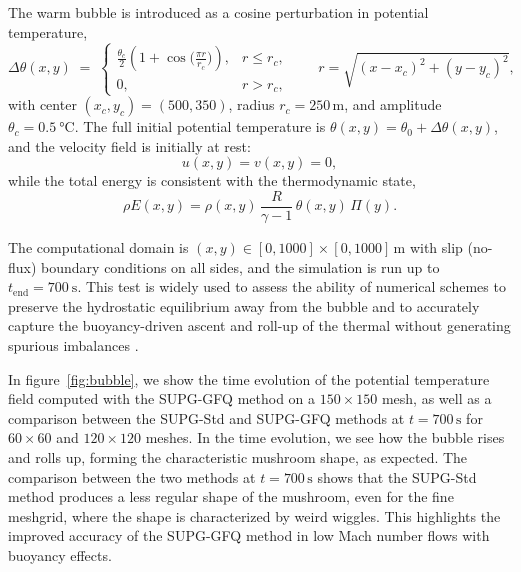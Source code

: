 \documentclass[a4paper,10pt]{article}
\begin{document}
		The warm bubble is introduced as a cosine perturbation in potential temperature,
		\begin{equation}
			\Delta\theta(x,y) \;=\;
			\begin{cases}
				\displaystyle \frac{\theta_c}{2}\left(1+\cos\!\Big(\frac{\pi r}{r_c}\Big)\right), & r \le r_c,\\[0.7em]
				0, & r>r_c,
			\end{cases}
			\qquad 
			r=\sqrt{(x-x_c)^2+(y-y_c)^2},
		\end{equation}
		with center $(x_c,y_c)=(500,350)$, radius $r_c=250\,\mathrm{m}$, and amplitude $\theta_c = \SI{0.5}{\celsius}$. 
		The full initial potential temperature is $\theta(x,y)=\theta_0+\Delta\theta(x,y)$, and the velocity field is initially at rest:
		\begin{equation}
			u(x,y)=v(x,y)=0,
		\end{equation}
		while the total energy is consistent with the thermodynamic state,
		\begin{equation}
			\rho E(x,y)=\rho(x,y)\,\frac{R}{\gamma-1}\,\theta(x,y)\,\Pi(y).
		\end{equation}
		
		The computational domain is $(x,y)\in[0,1000]\times[0,1000]\,\mathrm{m}$ with slip (no-flux) boundary conditions on all sides, and the simulation is run up to $t_{\mathrm{end}}=700~\mathrm{s}$. 
		This test is widely used to assess the ability of numerical schemes to preserve the hydrostatic equilibrium away from the bubble and to accurately capture the buoyancy-driven ascent and roll-up of the thermal without generating spurious imbalances \cite{marras2015stabilized,giraldo2008study}.
		
		In figure~\ref{fig:bubble}, we show the time evolution of the potential temperature field computed with the SUPG-GFQ method on a $150\times 150$ mesh, as well as a comparison between the SUPG-Std and SUPG-GFQ methods at $t=700\,\mathrm{s}$ for $60\times 60$ and $120\times 120$ meshes. In the time evolution, we see how the bubble rises and rolls up, forming the characteristic mushroom shape, as expected. 
		The comparison between the two methods at $t=700\,\mathrm{s}$ shows that the SUPG-Std method produces a less regular shape of the mushroom, even for the fine meshgrid, where the shape is characterized by weird wiggles.  
		This highlights the improved accuracy of the SUPG-GFQ method in low Mach number flows with buoyancy effects.
		
\end{document}
